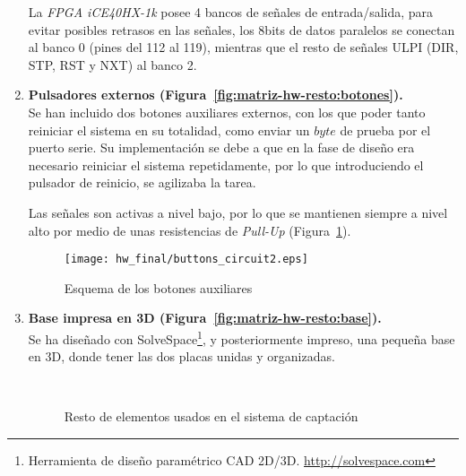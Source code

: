 \begin{enumerate}
    La \emph{FPGA iCE40HX-1k} posee 4 bancos de señales de entrada/salida, para evitar posibles retrasos en las señales\cite{fpga:routing}, los 8bits de datos paralelos se conectan al banco 0 (pines del 112 al 119), mientras que el resto de señales ULPI (DIR, STP, RST y NXT) al banco 2.
    
    \item \textbf{Pulsadores externos (Figura~\ref{fig:matriz-hw-resto:botones}).} \\
    Se han incluido dos botones auxiliares externos, con los que poder tanto reiniciar el sistema en su totalidad, como enviar un $byte$ de prueba por el puerto serie. Su implementación se debe a que en la fase de diseño era necesario reiniciar el sistema repetidamente, por lo que introduciendo el pulsador de reinicio, se agilizaba la tarea.
    
    Las señales son activas a nivel bajo, por lo que se mantienen siempre a nivel alto por medio de unas resistencias de \emph{Pull-Up} (Figura~\ref{fig:buttons_circuit}).
    \begin{figure}[h]
        \centering
        \texttt{[image: hw\_final/buttons\_circuit2.eps]}
        \caption{Esquema de los botones auxiliares}
        \label{fig:buttons_circuit}
    \end{figure}

    \item \textbf{Base impresa en 3D (Figura~\ref{fig:matriz-hw-resto:base}).} \\
    Se ha diseñado con SolveSpace\footnote{Herramienta de diseño paramétrico CAD 2D/3D. \url{http://solvespace.com}}, y posteriormente impreso, una pequeña base en 3D, donde tener las dos placas unidas y organizadas.

    \begin{figure}[!htb]
        \centering
         \\
        \caption{Resto de elementos usados en el sistema de captación} 
        \label{fig:matriz-hw-resto}
    \end{figure}
\end{enumerate}


